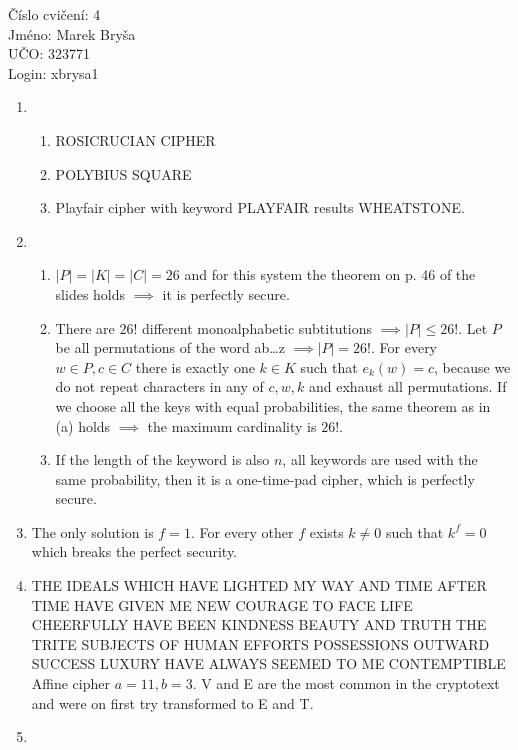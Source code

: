 \documentclass[a4paper,10pt]{extarticle}
\begin{document}
\begin{flushleft}
Číslo cvičení: 4 \\ 
Jméno: Marek Bryša \\
UČO: 323771\\
Login: xbrysa1\\
\end{flushleft}
\begin{enumerate}
  \item
    \begin{enumerate}
      \item
        ROSICRUCIAN CIPHER
      \item
        POLYBIUS SQUARE
      \item
        Playfair cipher with keyword PLAYFAIR results WHEATSTONE.
    \end{enumerate}
  \item
    \begin{enumerate}
      \item 
        $|P|=|K|=|C|=26$ and for this system the theorem on p. 46 of the slides holds $\implies$ it is perfectly secure.
      \item
        There are $26!$ different monoalphabetic subtitutions $\implies |P|\leq 26!$.
        Let $P$ be all permutations of the word ab\dots z $\implies |P|=26!$.
        For every $w\in P, c \in C$ there is exactly one $k\in K$ such that $e_k(w)=c$, because we do not repeat characters in any of $c,w,k$ and exhaust all permutations. 
        If we choose all the keys with equal probabilities, the same theorem as in (a) holds $\implies$ the maximum cardinality is $26!$.
      \item
        If the length of the keyword is also $n$, all keywords are used with the same probability, then it is a one-time-pad cipher, which is perfectly secure.
    \end{enumerate}
  \item
    The only solution is $f=1$. For every other $f$ exists $k\neq0$ such that $k^f=0$ which breaks the perfect security.
  \item
    THE IDEALS WHICH HAVE LIGHTED MY WAY AND TIME AFTER TIME HAVE GIVEN ME NEW COURAGE TO FACE LIFE CHEERFULLY HAVE BEEN KINDNESS BEAUTY AND TRUTH THE TRITE SUBJECTS OF HUMAN EFFORTS POSSESSIONS OUTWARD SUCCESS LUXURY HAVE ALWAYS SEEMED TO ME CONTEMPTIBLE\\
    Affine cipher $a=11, b=3$. V and E are the most common in the cryptotext and were on first try transformed to E and T.
  \item

\end{enumerate}
\end{document}
